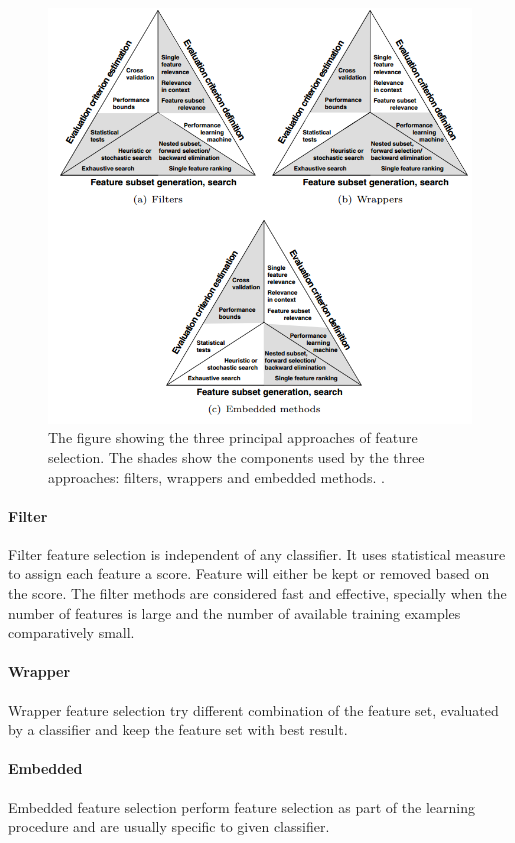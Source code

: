 \documentclass[USenglish]{ifimaster}  %
\begin{document}
\begin{figure}[h]
	\centering
	\includegraphics[scale=0.7]{Figures/FilterWrapperEmbedded.PNG}
	\caption{The figure showing the three principal approaches of feature selection. The shades show the
		components used by the three approaches: filters, wrappers and embedded methods. \cite{Guyon2006}.}
	\label{fig:fitting}
\end{figure}

\paragraph{Filter}
Filter feature selection is independent of any classifier. It uses statistical measure to assign each feature a score. Feature will either be kept or removed based on the score. The filter methods are considered fast and effective, specially when the number of features is large and the number of available training examples comparatively small.  


\paragraph{Wrapper}
Wrapper feature selection try different combination of the feature set, evaluated by a classifier and keep the feature set with best result.


\paragraph{Embedded}
Embedded feature selection perform feature selection as part of the learning procedure and are usually specific to given classifier.
\end{document}

